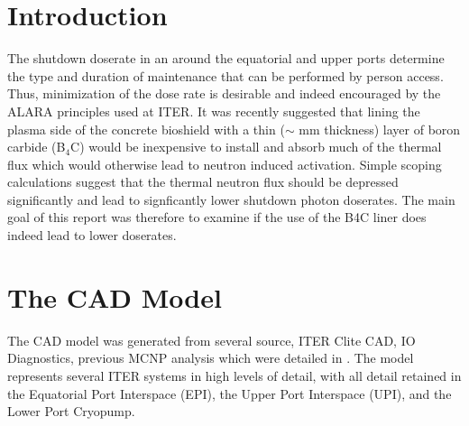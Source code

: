 \documentclass[12pt]{article}
\begin{document}
\maketitle
\newpage
\tableofcontents
\newpage
\section{Introduction}
The shutdown doserate in an around the equatorial and upper ports determine the type and duration of maintenance that can be
performed by person access. Thus, minimization of the dose rate is desirable and indeed encouraged by the ALARA principles used
at ITER. It was recently suggested that lining the plasma side of the concrete bioshield with a thin ($\sim$ mm thickness) layer of boron carbide (B$_4$C) would be inexpensive to install and absorb much of the thermal flux which would otherwise lead to neutron
induced activation. Simple scoping calculations suggest that the thermal neutron flux should be depressed significantly and lead
to signficantly lower shutdown photon doserates. The main goal of this report was therefore to examine if the use of the B4C liner
does indeed lead to lower doserates.

\section{The CAD Model}
The CAD model was generated from several source, ITER Clite CAD, IO Diagnostics, previous MCNP analysis which were detailed in \cite{cad_origination}. The model represents several ITER systems in high levels of detail, with all detail retained in the Equatorial Port Interspace (EPI), the  Upper Port Interspace (UPI), and the Lower Port Cryopump.
\end{document}
